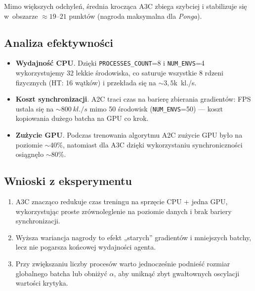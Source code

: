 \documentclass[12pt,a4paper]{article}
\begin{document}
Mimo większych odchyleń, średnia krocząca A3C
zbiega szybciej i stabilizuje się w~obszarze \( \approx 19\text{–}21\)
punktów (nagroda maksymalna dla \emph{Ponga}).

\subsection{Analiza efektywności}

\begin{itemize}
  \item \textbf{Wydajność CPU}.  
        Dzięki \texttt{PROCESSES\_COUNT}=8 i
        \texttt{NUM\_ENVS}=4 wykorzystujemy 32 lekkie środowiska,
        co saturuje wszystkie 8 rdzeni fizycznych
        (HT: 16 wątków) i przekłada się na
        \(\sim3{,}5\)k~kl./s.
  \item \textbf{Koszt synchronizacji}.  
        A2C traci czas na barierę zbierania gradientów:
        FPS ustala się na \(\sim 800~kl./s\) mimo
        50 środowisk (\texttt{NUM\_ENVS}=50) — koszt kopiowania
        dużego batcha na GPU co krok.
  \item \textbf{Zużycie GPU}. 
        Podczas trenowania algorytmu A2C zużycie GPU było na poziomie \(\sim 40\)\%,
        natomiast dla A3C dzięki wykorzystaniu synchroniczności osiągnęło \(\sim 80 \)\%.
\end{itemize}

\subsection*{Wnioski z eksperymentu}

\begin{enumerate}
  \item A3C znacząco redukuje czas treningu na sprzęcie CPU + jedna GPU,
        wykorzystując proste zrównoleglenie na poziomie danych
        i brak bariery synchronizacji.
  \item Wyższa wariancja nagrody to efekt
        „starych” gradientów i mniejszych batchy,
        lecz nie pogarsza końcowej wydajności agenta.
  \item Przy zwiększaniu liczby procesów
        warto jednocześnie podnieść rozmiar globalnego batcha
        lub obniżyć \(\alpha\), aby uniknąć zbyt gwałtownych
        oscylacji wartości krytyka.
\end{enumerate}
\end{document}
